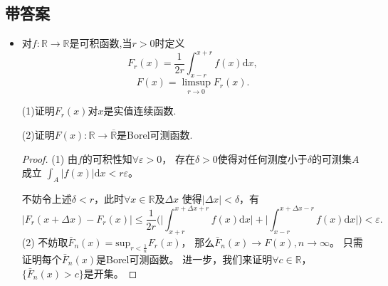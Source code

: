 \subsection{带答案}
\begin{itemize}
\item[一、]
对$ f\colon\mathbb{R} \to \mathbb{R}  $是可积函数,当$ r>0 $时定义
$$F_r(x) =\frac{1}{2r}\int_{x-r}^{x+r}{f(x) \text{d}x},$$
$$F(x) =\limsup_{r\to0} F_r(x).$$

(1)证明$ F_{r}(x) $对$ x $是实值连续函数.

(2)证明$ F(x) : \mathbb{R} \to \overline{\mathbb{R}}$是Borel可测函数.
\begin{proof}
    (1) 由$f$的可积性知$\forall \varepsilon > 0$，
    存在$\delta > 0$使得对任何测度小于$\delta$的可测集$A$成立
    $\int_A |f(x)| \mathrm{d} x < r\varepsilon$。

    不妨令上述$\delta < r$，此时$\forall x \in \mathbb{R}$及$\Delta x$
    使得$|\Delta x| < \delta$，有
    \[|F_r(x+\Delta x) - F_r(x)| 
    \le \frac{1}{2r}\bigg(\bigg|\int_{x+r}^{x+\Delta x +r} f(x) \mathrm{d} x\bigg| 
    + \bigg|\int_{x-r}^{x+\Delta x -r} f(x) \mathrm{d} x\bigg|\bigg) < \varepsilon.\]
    (2) 不妨取$\bar{F}_n(x) = \text{sup}_{r < \frac{1}{n}} F_r(x)$，
    那么$\bar{F}_n(x) \to F(x),n\to \infty$。
    只需证明每个$\bar{F}_n(x)$是Borel可测函数。
    进一步，我们来证明$\forall c \in \mathbb{R}$，$\{\bar{F}_n(x) > c\}$是开集。


\end{proof}
\end{itemize}
